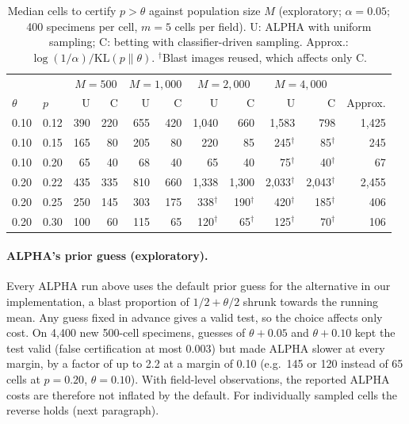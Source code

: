 \documentclass[11pt]{article}
\theoremstyle{remark}
\theoremstyle{definition}
\begin{document}
\begin{table}[t]
\centering\small
\caption{Median cells to certify $p>\theta$ against population size $M$ (exploratory; $\alpha=0.05$; 400 specimens per cell, $m=5$ cells per field). U: ALPHA with uniform sampling; C: betting with classifier-driven sampling. Approx.: $\log(1/\alpha)/\mathrm{KL}(p\|\theta)$. $^\dagger$Blast images reused, which affects only C.}\label{tab:mscale}
\begin{tabular}{@{}llrrrrrrrrr@{}}
\toprule
 & & \multicolumn{2}{c}{$M=500$} & \multicolumn{2}{c}{$M=1{,}000$} & \multicolumn{2}{c}{$M=2{,}000$} & \multicolumn{2}{c}{$M=4{,}000$} & \\
$\theta$ & $p$ & U & C & U & C & U & C & U & C & Approx.\\
\midrule
0.10 & 0.12 & 390 & 220 & 655 & 420 & 1,040 & 660 & 1,583 & 798 & 1,425\\
0.10 & 0.15 & 165 & 80 & 205 & 80 & 220 & 85 & 245$^\dagger$ & 85$^\dagger$ & 245\\
0.10 & 0.20 & 65 & 40 & 68 & 40 & 65 & 40 & 75$^\dagger$ & 40$^\dagger$ & 67\\
0.20 & 0.22 & 435 & 335 & 810 & 660 & 1,338 & 1,300 & 2,033$^\dagger$ & 2,043$^\dagger$ & 2,455\\
0.20 & 0.25 & 250 & 145 & 303 & 175 & 338$^\dagger$ & 190$^\dagger$ & 420$^\dagger$ & 185$^\dagger$ & 406\\
0.20 & 0.30 & 100 & 60 & 115 & 65 & 120$^\dagger$ & 65$^\dagger$ & 125$^\dagger$ & 70$^\dagger$ & 106\\
\bottomrule
\end{tabular}
\end{table}

\paragraph{ALPHA's prior guess (exploratory).} Every ALPHA run above uses the default prior guess for the alternative in our implementation, a blast proportion of $1/2+\theta/2$ shrunk towards the running mean. Any guess fixed in advance gives a valid test, so the choice affects only cost. On 4,400 new 500-cell specimens, guesses of $\theta+0.05$ and $\theta+0.10$ kept the test valid (false certification at most 0.003) but made ALPHA slower at every margin, by a factor of up to 2.2 at a margin of 0.10 (e.g.\ 145 or 120 instead of 65 cells at $p=0.20$, $\theta=0.10$). With field-level observations, the reported ALPHA costs are therefore not inflated by the default. For individually sampled cells the reverse holds (next paragraph).
\end{document}
